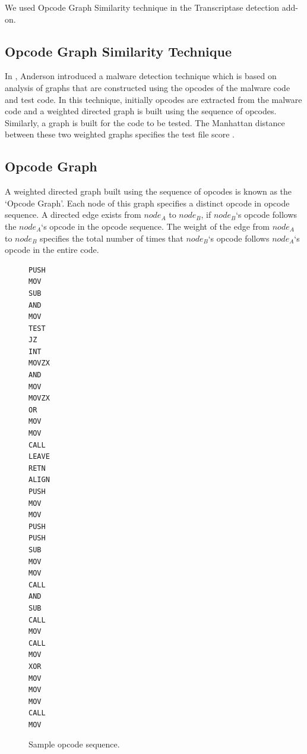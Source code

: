 We used Opcode Graph Similarity technique in the Transcriptase detection add-on.

\subsection{Opcode Graph Similarity Technique}

In \cite{bib2}, Anderson introduced a malware detection technique which is based on analysis of graphs that are constructed using the opcodes of the malware code and test code. In this technique, initially opcodes are extracted from the malware code and a weighted directed graph is built using the sequence of opcodes. Similarly, a graph is built for the code to be tested. The Manhattan distance between these two weighted graphs specifies the test file score \cite{bib4}.

\subsection{Opcode Graph}

A weighted directed graph built using the sequence of opcodes is known as the `Opcode Graph'. Each node of this graph specifies a distinct opcode in opcode sequence. A directed edge exists from $node_A$ to $node_B$, if $node_B$`s opcode follows the $node_A$`s opcode in the opcode sequence. The weight of the edge from $node_A$ to $node_B$ specifies the total number of times that $node_B$`s opcode follows $node_A$`s opcode in the entire code. 

\begin{figure}[h]
  \centering
\begin{lstlisting}[frame=none,language=myasm,multicols=2] 
PUSH
MOV
SUB
AND
MOV
TEST
JZ
INT
MOVZX
AND
MOV
MOVZX
OR
MOV
MOV
CALL
LEAVE
RETN
ALIGN
PUSH
MOV
MOV
PUSH
PUSH
SUB
MOV
MOV
CALL
AND
SUB
CALL
MOV
CALL
MOV
XOR
MOV
MOV
MOV
CALL
MOV
\end{lstlisting}
    \caption[Sample opcode sequence]{Sample opcode sequence.}
    \label{fig:opcodesequence}
\end{figure}

